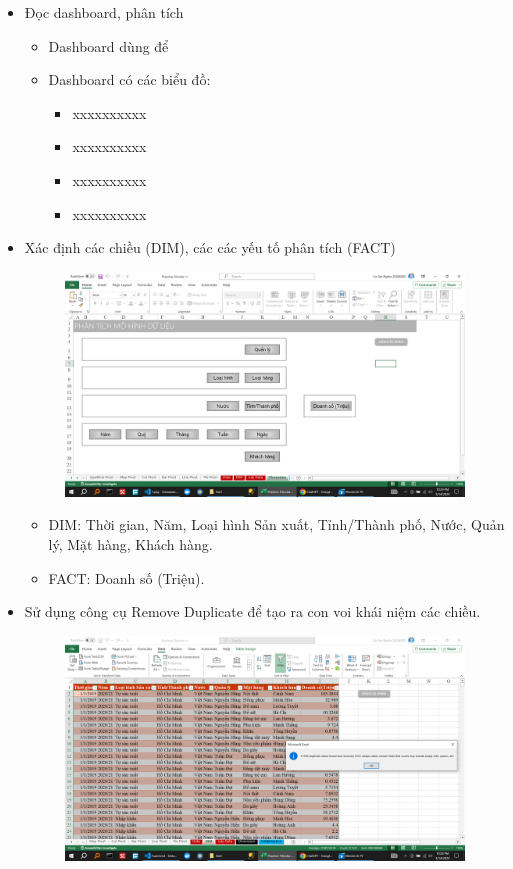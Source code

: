 \documentclass{article}
\begin{document}
\begin{itemize}
\item Đọc dashboard, phân tích
\begin{itemize}
\item Dashboard dùng để
\item Dashboard có các biểu đồ:
\begin{itemize}
\item xxxxxxxxxx
\item xxxxxxxxxx
\item xxxxxxxxxx
\item xxxxxxxxxx
\end{itemize}
\end{itemize}
\item Xác định các chiều (DIM), các các yếu tố phân tích (FACT)

\begin{figure}[H]
\centering
\includegraphics[scale = 0.15]{Bai1/ThucHanh/1.png}
\end{figure}

\begin{itemize}
\item DIM: Thời gian, Năm, Loại hình Sản xuất, Tỉnh/Thành phố, Nước, Quản lý, Mặt hàng, Khách hàng.
\item FACT: Doanh số (Triệu).
\end{itemize}

\item Sử dụng công cụ Remove Duplicate để tạo ra con voi khái niệm các chiều.

\begin{figure}[H]
\centering
\includegraphics[scale = 0.15]{Bai1/ThucHanh/2.png}
\end{figure}


\end{itemize}
\end{document}
